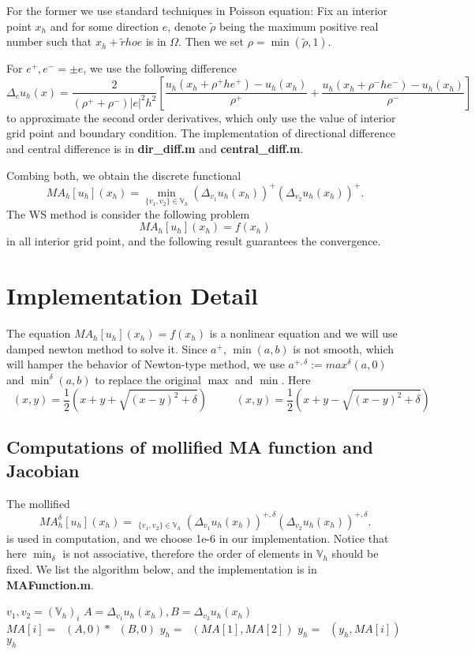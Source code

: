 \documentclass{article}
\DeclareMathOperator{\maxd}{\max\nolimits^\delta}
\DeclareMathOperator{\mind}{\min\nolimits^\delta}
\DeclareMathOperator{\MA}{MA}
\newcommand{\bV}{\mathbb V}
\begin{document}
For the former we use standard techniques in Poisson equation: Fix an interior point $x_h$ and for some direction $e$, denote $\tilde \rho$ being the maximum positive real number such that $x_h + \tilde rho e$ is in $\Omega$. Then we set $\rho = \min(\tilde \rho, 1)$. 

For $e^+, e^- = \pm e$, we use the following difference 
$$\Delta_e u_h(x) = \frac{2}{(\rho^+ + \rho^-) |e|^2 h^2} \left[ \frac{u_h(x_h+\rho^+he^+) - u_h(x_h)}{\rho^+} + \frac{u_h(x_h+\rho^-he^-) - u_h(x_h)}{\rho^-}\right]$$
to approximate the second order derivatives, which only use the value of interior grid point and boundary condition. The implementation of directional difference and central difference is in \textbf{dir\_diff.m} and \textbf{central\_diff.m}.

Combing both, we obtain the discrete functional
$$MA_h[u_h](x_h) = \min_{\{v_1, v_2\} \in \mathbb V_h}(\Delta_{v_1}u_h(x_h))^+(\Delta_{v_2}u_h(x_h))^+.$$
The WS method is consider the following problem 
$$MA_h[u_h](x_h) = f(x_h)$$ in all interior grid point,  and
 the following result guarantees the convergence.
\tbc
\section{Implementation Detail}
The equation $MA_h[u_h](x_h) = f(x_h)$ is a nonlinear equation and we will use damped newton method to solve it. Since $a^+$, $\min(a,b)$ is not smooth, which will hamper the behavior of Newton-type method, we use $a^{+,\delta}:= max^{\delta}(a,0)$ and $\min^{\delta}(a,b)$ to replace the original $\max$ and $\min$. Here $$\maxd(x,y) = \frac{1}{2}(x+y+\sqrt{(x-y)^2+\delta}) \qquad \mind(x,y) = \frac{1}{2}(x+y-\sqrt{(x-y)^2+\delta}) $$
\subsection{Computations of mollified MA function and Jacobian}
The mollified $$MA_h^{\delta}[u_h](x_h) = \mind_{\{v_1, v_2\} \in \mathbb V_h}(\Delta_{v_1}u_h(x_h))^{+,\delta}(\Delta_{v_2}u_h(x_h))^{+,\delta}.$$ is used in computation, and we choose 1e-6 in our implementation. Notice that here $\min_{\delta}$ is not associative, therefore the order of elements in $\bV_h$ should be fixed. We list the algorithm below, and the implementation is in \textbf{MAFunction.m}.
\begin{algorithm}[H]
	\caption{$y_h = \MA_h^{\delta}[u_h](x_h)$}
	\begin{algorithmic}[1]
		\FOR{$i=1:|\bV_h|$}
		\STATE $v_1, v_2 = (\bV_h)_i$
		\STATE $A = \Delta_{v_1}u_h(x_h), B = \Delta_{v_2}u_h(x_h)$
		\STATE $MA[i] = \maxd(A,0)*\maxd(B,0)$
		\ENDFOR
		\STATE $y_h = \mind(MA[1], MA[2])$
		\FOR{$i=3:|\bV_h|$}
		\STATE $y_h = \mind(y_h, MA[i])$
		\ENDFOR
		\STATE \Return $y_h$
	\end{algorithmic}
\end{algorithm}
\end{document}

